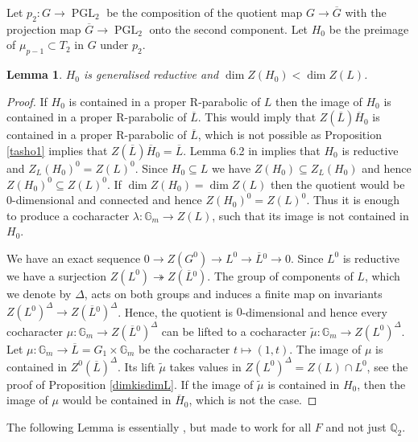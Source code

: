 \documentclass{amsart}
\newtheorem{lem}[prop]{Lemma}
\theoremstyle{definition}
\theoremstyle{remark}
\newcommand{\Gm}{\mathbb G_{m}}
\DeclareMathOperator{\PGL}{PGL}
\newcommand{\Gbar}{\overline{G}}
\newcommand{\Lbar}{\overline{L}}
\begin{document}
Let $p_2: G\rightarrow \PGL_2$ be the composition of the quotient map 
$G\rightarrow \Gbar$ with the projection map $\Gbar\rightarrow \PGL_2$ onto the second component. 
Let $H_0$ be the preimage of $\mu_{p-1}\subset T_2$ in $G$ under $p_2$. 

\begin{lem}\label{bound_centre_Hzero} $H_0$ 
is generalised reductive and $\dim Z(H_0)< \dim Z(L)$. 
\end{lem} 

\begin{proof} 
    If $H_0$ is contained in a proper R-parabolic of $L$ then the image 
    of $H_0$ is contained in a proper R-parabolic of $\overline{L}$. This would imply that 
    $Z(\Lbar) \overline{H}_0$ is contained in a proper R-parabolic of $\overline{L}$, which 
    is not possible as Proposition \ref{tasho1} implies that  $Z(\Lbar) \overline{H}_0= \Lbar$. 
    Lemma 6.2 in \cite{martin} implies that $H_0$ is reductive and $Z_{L}(H_0)^0= Z(L)^0$.
    Since $H_0\subseteq L$ we have $Z(H_0)\subseteq Z_{L}(H_0)$ and hence 
    $Z(H_0)^0 \subseteq Z(L)^0$. If $\dim Z(H_0)= \dim Z(L)$ then the quotient would be 
    $0$-dimensional and connected and hence $Z(H_0)^0 = Z(L)^0$. Thus it is enough to produce 
    a cocharacter $\lambda: \Gm\rightarrow Z(L)$, such that its image is not contained in $H_0$. 
    
    We have an exact sequence $0\rightarrow Z(G^0)\rightarrow L^0 \rightarrow \overline{L}{}^0\rightarrow 0$. 
    Since $L^0$ is reductive we have a surjection $Z(L^0)\twoheadrightarrow Z(\overline{L}{}^0)$. The group 
    of components of $L$, which we denote by $\Delta$,  acts on both groups and induces a finite map 
    on invariants $Z(L^0)^{\Delta} \rightarrow Z(\overline{L}{}^0)^{\Delta}$. 
    Hence, the quotient is $0$-dimensional and hence every cocharacter $\mu:\Gm\rightarrow Z(\overline{L}{}^0)^{\Delta}$
    can be lifted to a cocharacter $\tilde{\mu}: \Gm\rightarrow Z(L^0)^{\Delta}$. Let $\mu: \Gm \rightarrow 
    \Lbar=G_1\times \Gm$ be the cocharacter $t\mapsto (1,t)$. The image of $\mu$ is contained in 
    $Z^0(\Lbar)^{\Delta}$. Its lift $\tilde{\mu}$ takes values in $Z(L^0)^{\Delta}= Z(L)\cap L^0$, see 
    the proof of Proposition \ref{dimkisdimL}. If the image 
    of $\tilde{\mu}$ is contained in $H_0$, then the image of $\mu$ would be contained in $\overline{H}_0$, which 
    is not the case. 
\end{proof} 

The following Lemma is essentially \cite[Lemma 4.2]{BIP_new}, but made to work for all $F$ and not just 
$\mathbb{Q}_2$. 
\end{document}
